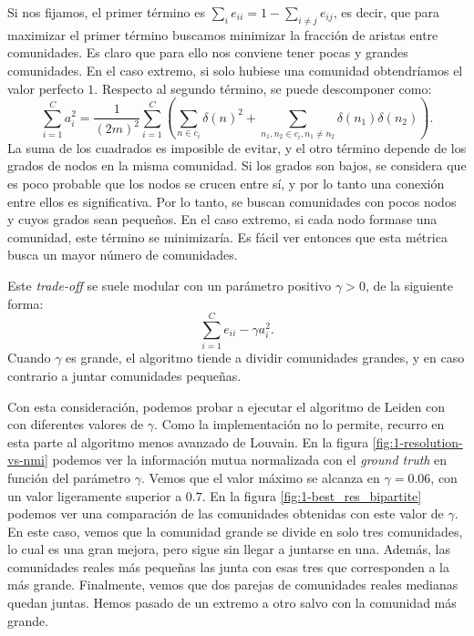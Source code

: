 Si nos fijamos, el primer término es $\sum_i e_{ii} = 1 - \sum_{i\neq j}
e_{ij}$, es decir, que para maximizar el primer término buscamos minimizar la
fracción de aristas entre comunidades. Es claro que para ello nos conviene
tener pocas y grandes comunidades. En el caso extremo, si solo hubiese una
comunidad obtendríamos el valor perfecto $1$. Respecto al segundo término, se
puede descomponer como:
$$
\sum_{i=1}^C a_i^2 =
\frac{1}{(2m)^2} \sum_{i=1}^C \left( \sum_{n \in c_i} \delta(n)^2 + \sum_{n_1, n_2 \in c_i, n_1 \neq n_2} \delta(n_1) \delta(n_2) \right) 
.$$
La suma de los cuadrados es imposible de evitar, y el otro término depende de
los grados de nodos en la misma comunidad. Si los grados son bajos, se
considera que es poco probable que los nodos se crucen entre sí, y por lo tanto
una conexión entre ellos es significativa. Por lo tanto, se buscan comunidades
con pocos nodos y cuyos grados sean pequeños. En el caso extremo, si cada nodo
formase una comunidad, este término se minimizaría. Es fácil ver entonces que
esta métrica busca un mayor número de comunidades.

Este \emph{trade-off} se suele modular con un parámetro positivo $\gamma > 0$,
de la siguiente forma:
$$
\sum_{i=1}^C e_{ii} - \gamma a_i^2
.$$
Cuando $\gamma$ es grande, el algoritmo tiende a dividir comunidades grandes, y
en caso contrario a juntar comunidades pequeñas.

Con esta consideración, podemos probar a ejecutar el algoritmo de Leiden con
con diferentes valores de $\gamma$. Como la implementación no lo permite,
recurro en esta parte al algoritmo menos avanzado de Louvain. En la figura
\ref{fig:1-resolution-vs-nmi} podemos ver la información mutua normalizada con
el \emph{ground truth} en función del parámetro $\gamma$. Vemos que el valor
máximo se alcanza en $\gamma = 0.06$, con un valor ligeramente
superior a $0.7$. En la figura \ref{fig:1-best_res_bipartite} podemos ver una
comparación de las comunidades obtenidas con este valor de $\gamma$. En este caso,
vemos que la comunidad grande se divide en solo tres comunidades, lo cual es una
gran mejora, pero sigue sin llegar a juntarse en una. Además, las comunidades
reales más pequeñas las junta con esas tres que corresponden a la más grande.
Finalmente, vemos que dos parejas de comunidades reales medianas quedan juntas.
Hemos pasado de un extremo a otro salvo con la comunidad más grande.

